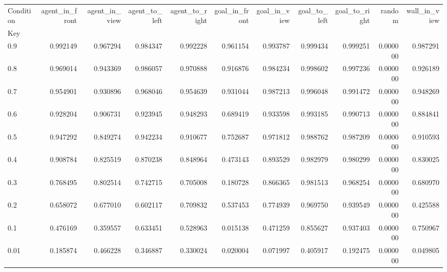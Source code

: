 \begin{tabular}{lrrrrrrrrrr}
\toprule
Condition & agent\_in\_front & agent\_in\_view & agent\_to\_left & agent\_to\_right & goal\_in\_front & goal\_in\_view & goal\_to\_left & goal\_to\_right & random & wall\_in\_view \\
Key &  &  &  &  &  &  &  &  &  &  \\
\midrule
0.9 & 0.992149 & 0.967294 & 0.984347 & 0.992228 & 0.961154 & 0.993787 & 0.999434 & 0.999251 & 0.000000 & 0.987291 \\
0.8 & 0.969014 & 0.943369 & 0.986057 & 0.970888 & 0.916876 & 0.984234 & 0.998602 & 0.997236 & 0.000000 & 0.926189 \\
0.7 & 0.954901 & 0.930896 & 0.968046 & 0.954639 & 0.931044 & 0.987213 & 0.996048 & 0.991472 & 0.000000 & 0.948269 \\
0.6 & 0.928204 & 0.906731 & 0.923945 & 0.948293 & 0.689419 & 0.933598 & 0.993185 & 0.990713 & 0.000000 & 0.884841 \\
0.5 & 0.947292 & 0.849274 & 0.942234 & 0.910677 & 0.752687 & 0.971812 & 0.988762 & 0.987209 & 0.000000 & 0.910593 \\
0.4 & 0.908784 & 0.825519 & 0.870238 & 0.848964 & 0.473143 & 0.893529 & 0.982979 & 0.980299 & 0.000000 & 0.830025 \\
0.3 & 0.768495 & 0.802514 & 0.742715 & 0.705008 & 0.180728 & 0.866365 & 0.981513 & 0.968254 & 0.000000 & 0.680970 \\
0.2 & 0.658072 & 0.677010 & 0.602117 & 0.709832 & 0.537453 & 0.774939 & 0.969750 & 0.939549 & 0.000000 & 0.425588 \\
0.1 & 0.476169 & 0.359557 & 0.633451 & 0.528963 & 0.015138 & 0.471259 & 0.855627 & 0.937403 & 0.000000 & 0.750967 \\
0.01 & 0.185874 & 0.466228 & 0.346887 & 0.330024 & 0.020004 & 0.071997 & 0.405917 & 0.192475 & 0.000000 & 0.049805 \\
\bottomrule
\end{tabular}
